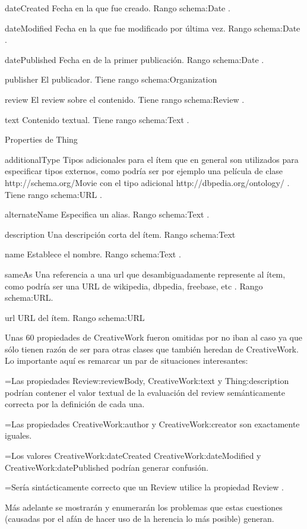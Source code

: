 dateCreated 	Fecha en la que fue creado. Rango schema:Date .

dateModified 	Fecha en la que fue modificado por última vez. Rango schema:Date .

datePublished 	Fecha en de la primer publicación. Rango schema:Date .

publisher 	El publicador. Tiene rango schema:Organization

review 	 	El review sobre el contenido. Tiene rango schema:Review .

text 		Contenido textual. Tiene rango schema:Text .


Properties de Thing

additionalType 	 Tipos adicionales para el ítem que en general son utilizados para especificar tipos externos, como podría ser por ejemplo una película de clase http://schema.org/Movie con el tipo adicional  http://dbpedia.org/ontology/ . Tiene rango schema:URL .

alternateName 	 Especifica un alias. Rango schema:Text .

description 	Una descripción corta del ítem. Rango schema:Text 

name 		Establece el nombre. Rango schema:Text .

sameAs 		Una referencia a una url que desambiguadamente represente al ítem, como podría ser una URL de wikipedia, dbpedia, freebase, etc . Rango schema:URL.

url 		URL del ítem. Rango schema:URL

Unas 60 propiedades de CreativeWork fueron omitidas por no iban al caso ya que sólo tienen razón de ser para otras clases que 
también heredan de CreativeWork. Lo importante aquí es remarcar un par de situaciones interesantes:

=Las propiedades Review:reviewBody, CreativeWork:text y Thing:description podrían contener el valor textual de la evaluación del review semánticamente correcta por la definición de cada una.

=Las propiedades CreativeWork:author y CreativeWork:creator son exactamente iguales. 

=Los valores CreativeWork:dateCreated CreativeWork:dateModified y CreativeWork:datePublished podrían generar confusión. 

=Sería sintácticamente correcto que un Review utilice la propiedad Review .

Más adelante se mostrarán y enumerarán los problemas que estas cuestiones (causadas por el afán de hacer uso de la herencia
lo más posible)  generan. 
